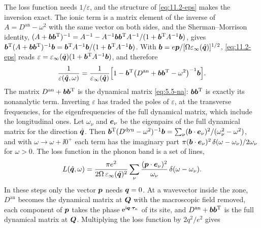The loss function needs $1/\varepsilon$, and the structure of \cref{eq:11.2-eps} makes the inversion exact. The ionic term is a matrix element of the inverse of $A = D^{\mathrm{an}} - \omega^2$ with the same vector on both sides, and the Sherman--Morrison identity, $(A + \bm{b}\bm{b}^{\mathrm{T}})^{-1} = A^{-1} - A^{-1}\bm{b}\bm{b}^{\mathrm{T}}A^{-1}/(1 + \bm{b}^{\mathrm{T}}A^{-1}\bm{b})$, gives $\bm{b}^{\mathrm{T}}(A + \bm{b}\bm{b}^{\mathrm{T}})^{-1}\bm{b} = \bm{b}^{\mathrm{T}}A^{-1}\bm{b}/(1 + \bm{b}^{\mathrm{T}}A^{-1}\bm{b})$. With $\bm{b} = e\bm{p}/[\Omega\varepsilon_\infty(\hat{\bm{q}})]^{1/2}$, \cref{eq:11.2-eps} reads $\varepsilon = \varepsilon_\infty(\hat{\bm{q}})(1 + \bm{b}^{\mathrm{T}}A^{-1}\bm{b})$, and therefore
\begin{equation}
  \frac{1}{\varepsilon(\hat{\bm{q}},\omega)} = \frac{1}{\varepsilon_\infty(\hat{\bm{q}})}\Bigl[1 - \bm{b}^{\mathrm{T}}\bigl(D^{\mathrm{an}} + \bm{b}\bm{b}^{\mathrm{T}} - \omega^2\bigr)^{-1}\bm{b}\Bigr] .
  \label{eq:11.2-SM}
\end{equation}
The matrix $D^{\mathrm{an}} + \bm{b}\bm{b}^{\mathrm{T}}$ is the dynamical matrix \cref{eq:5.5-na}: $\bm{b}\bm{b}^{\mathrm{T}}$ is exactly its nonanalytic term. Inverting $\varepsilon$ has traded the poles of $\varepsilon$, at the transverse frequencies, for the eigenfrequencies of the full dynamical matrix, which include the longitudinal ones. Let $\omega_\nu$ and $\bm{e}_\nu$ be the eigenpairs of the full dynamical matrix for the direction $\hat{\bm{q}}$. Then $\bm{b}^{\mathrm{T}}(D^{\mathrm{dyn}} - \omega^2)^{-1}\bm{b} = \sum_\nu(\bm{b}\cdot\bm{e}_\nu)^2/(\omega_\nu^2 - \omega^2)$, and with $\omega \to \omega + \ii0^+$ each term has the imaginary part $\pi(\bm{b}\cdot\bm{e}_\nu)^2\,\delta(\omega - \omega_\nu)/2\omega_\nu$ for $\omega > 0$. The loss function in the phonon band is a set of lines,
\begin{equation*}
  L(\hat{\bm{q}},\omega) = \frac{\pi e^2}{2\Omega\,\varepsilon_\infty(\hat{\bm{q}})^2}\sum_\nu\frac{(\bm{p}\cdot\bm{e}_\nu)^2}{\omega_\nu}\,\delta(\omega - \omega_\nu) .
\end{equation*}
In these steps only the vector $\bm{p}$ needs $\bm{q} = 0$. At a wavevector inside the zone, $D^{\mathrm{an}}$ becomes the dynamical matrix at $\bm{Q}$ with the macroscopic field removed, each component of $\bm{p}$ takes the phase $\mathrm{e}^{\mathrm{i}\bm{q}\cdot\bm{\tau}_\kappa}$ of its site, and $D^{\mathrm{an}} + \bm{b}\bm{b}^{\mathrm{T}}$ is the full dynamical matrix at $\bm{Q}$. Multiplying the loss function by $2q^2/e^2$ gives

